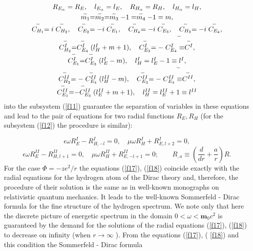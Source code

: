 \documentclass[a4paper,12pt]{article}
\begin{document}
\begin{equation}
\begin{array}{c}
R_{E_\alpha }=R_E,\quad l_{E_\alpha }=l_E,\quad R_{H_\alpha }=R_H,\quad
l_{H_\alpha }=l_H, \\
\stackrel{-}{m_1}=\stackrel{-}{m_2}=\stackrel{-}{m_3}-1=\stackrel{-}{m_4}%
-1=m, \\
\stackrel{-}{C_{H_1}}=i\stackrel{-}{C_{H_2}},\quad \stackrel{-}{C_{E_2}}=-i%
\stackrel{-}{C_{E_1}},\quad \stackrel{-}{C_{H_4}}=-i\stackrel{-}{C_{E_3}}%
,\quad \stackrel{-}{C_{H_3}}=-i\stackrel{-}{C_{E_4}}, \\
\stackrel{-}{C_{H_2}^I}=\stackrel{-}{C_{E_4}^I}(l_H^I+m+1),\quad \stackrel{-%
}{C_{E_3}^I}=-\stackrel{-}{C_{E_4}^I\equiv \stackrel{-}{C^I}}, \\
\stackrel{-}{C_{E_1}^I}=\stackrel{-}{C_{E_3}^I}(l_E^I-m),\quad
l_H^I=l_E^I-1\equiv l^I, \\
\stackrel{-}{C_{H_2}^{II}}=-\stackrel{-}{C_{E_4}^{II}}(l_H^{II}-m),\quad
\stackrel{-}{C_{E_3}^{II}}=-\stackrel{-}{C_{E_4}^{II}\equiv \stackrel{-}{%
C^{II}}}, \\
\stackrel{-}{C_{E_1}^{II}}=\stackrel{-}{-C_{E_3}^{II}}(l_E^{II}+m+1),\quad
l_H^{II}=l_E^{II}+1\equiv l^{II}
\end{array}
\label{f16}
\end{equation}
into the subsystem (\ref{f11}) guarantee the separation of variables in
these equations and lead to the pair of equations for two radial functions $%
R_E,R_H$ (for the subsystem (\ref{f12}) the procedure is similar):

\begin{equation}
\epsilon \omega R_E^I-R_{H,-l}^I=0,\quad \mu \omega R_H^I+R_{E,l+2}^I=0,
\label{f17}
\end{equation}
\begin{equation}
\epsilon \omega R_E^{II}-R_{H,l+1}^{II}=0,\quad \mu \omega
R_H^{II}+R_{E,-l+1}^{II}=0;\quad \quad R_{,a}\equiv \left( \frac d{dr}+\frac
ar\right) R.  \label{f18}
\end{equation}
For the case $\Phi =-ze^2/r$ the equations (\ref{f17}), (\ref{f18}) coincide
exactly with the radial equations for the hydrogen atom of the Dirac theory
and, therefore, the procedure of their solution is the same as in well-known
monographs on relativistic quantum mechanics. It leads to the well-known
Sommerfeld - Dirac formula for the fine structure of the hydrogen spectrum.
We note only that here the discrete picture of energetic spectrum in the
domain $0<\omega <\mathbf{m}_0c^2$ is guaranteed by the demand for the
solutions of the radial equations (\ref{f17}), (\ref{f18}) to decrease on
infinity (when $r\rightarrow \infty $ ). From the equations (\ref{f17}), (%
\ref{f18}) and this condition the Sommerfeld - Dirac formula
\end{document}
